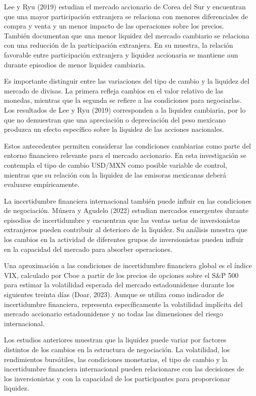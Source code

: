 Lee y Ryu (2019) estudian el mercado accionario de Corea del Sur y encuentran que una mayor participación extranjera se relaciona con menores diferenciales de compra y venta y un menor impacto de las operaciones sobre los precios. También documentan que una menor liquidez del mercado cambiario se relaciona con una reducción de la participación extranjera. En su muestra, la relación favorable entre participación extranjera y liquidez accionaria se mantiene aun durante episodios de menor liquidez cambiaria.

Es importante distinguir entre las variaciones del tipo de cambio y la liquidez del mercado de divisas. La primera refleja cambios en el valor relativo de las monedas, mientras que la segunda se refiere a las condiciones para negociarlas. Los resultados de Lee y Ryu (2019) corresponden a la liquidez cambiaria, por lo que no demuestran que una apreciación o depreciación del peso mexicano produzca un efecto específico sobre la liquidez de las acciones nacionales.

Estos antecedentes permiten considerar las condiciones cambiarias como parte del entorno financiero relevante para el mercado accionario. En esta investigación se contempla el tipo de cambio USD/MXN como posible variable de control, mientras que su relación con la liquidez de las emisoras mexicanas deberá evaluarse empíricamente.

La incertidumbre financiera internacional también puede influir en las condiciones de negociación. Múnera y Agudelo (2022) estudian mercados emergentes durante episodios de incertidumbre y encuentran que las ventas netas de inversionistas extranjeros pueden contribuir al deterioro de la liquidez. Su análisis muestra que los cambios en la actividad de diferentes grupos de inversionistas pueden influir en la capacidad del mercado para absorber operaciones.

Una aproximación a las condiciones de incertidumbre financiera global es el índice VIX, calculado por Cboe a partir de los precios de opciones sobre el S\&P 500 para estimar la volatilidad esperada del mercado estadounidense durante los siguientes treinta días (Doar, 2023). Aunque se utiliza como indicador de incertidumbre financiera, representa específicamente la volatilidad implícita del mercado accionario estadounidense y no todas las dimensiones del riesgo internacional.

Los estudios anteriores muestran que la liquidez puede variar por factores distintos de los cambios en la estructura de negociación. La volatilidad, los rendimientos bursátiles, las condiciones monetarias, el tipo de cambio y la incertidumbre financiera internacional pueden relacionarse con las decisiones de los inversionistas y con la capacidad de los participantes para proporcionar liquidez.

